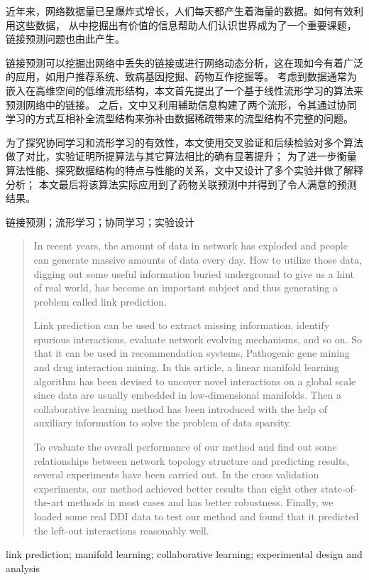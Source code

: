

\begin{zhaiyao}

近年来，网络数据量已呈爆炸式增长，人们每天都产生着海量的数据。如何有效利用这些数据，
从中挖掘出有价值的信息帮助人们认识世界成为了一个重要课题，链接预测问题也由此产生。


链接预测可以挖掘出网络中丢失的链接或进行网络动态分析，这在现如今有着广泛的应用，如用户推荐系统、致病基因挖掘、药物互作挖掘等。
考虑到数据通常为嵌入在高维空间的低维流形结构，本文首先提出了一个基于线性流形学习的算法来预测网络中的链接。
之后，文中又利用辅助信息构建了两个流形，令其通过协同学习的方式互相补全流型结构来弥补由数据稀疏带来的流型结构不完整的问题。


为了探究协同学习和流形学习的有效性，本文使用交叉验证和后续检验对多个算法做了对比，实验证明所提算法与其它算法相比的确有显著提升；
为了进一步衡量算法性能、探究数据结构的特点与性能的关系，文中又设计了多个实验并做了解释分析；
本文最后将该算法实际应用到了药物关联预测中并得到了令人满意的预测结果。
\end{zhaiyao}


\vspace{20pt}

\begin{guanjianci}
链接预测；流形学习；协同学习；实验设计
\end{guanjianci}



\begin{abstract}


In recent years, the amount of data in network has exploded and people can generate massive amounts of data every day. 
How to utilize those data, digging out some useful information buried underground to give us a hint of real world, 
has become an important subject and thus generating a problem called link prediction.


Link prediction can be used to extract missing information, identify spurious interactions, evaluate network evolving mechanisms, and so on. 
So that it can be used in recommendation systems, Pathogenic gene mining and drug interaction mining. 
In this article, a linear manifold learning algorithm has been devised to uncover novel interactions on a global scale 
since data are usually embedded in low-dimensional manifolds. Then a collaborative learning method has been introduced 
with the help of auxiliary information to solve the problem of data sparsity.


To evaluate the overall performance of our method and find out some relationships between network topology structure 
and predicting results, several experiments have been carried out. In the cross validation experiments, 
our method achieved better results than eight other state-of-the-art methods in most cases and has better robustness. 
Finally, we loaded some real DDI data to test our method and found that it predicted the left-out interactions reasonably well.

\end{abstract}


\vspace{20pt}


\begin{keywords}
link prediction; manifold learning; collaborative learning; experimental design and analysis
\end{keywords} 